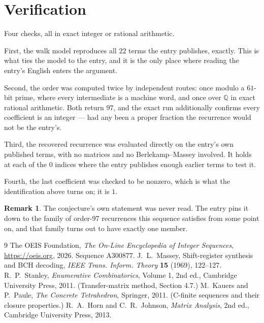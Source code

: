 \documentclass[11pt,a4paper]{article}
\theoremstyle{plain}
\theoremstyle{definition}
\newtheorem{remark}[theorem]{Remark}
\begin{document}
\section{Verification}

Four checks, all in exact integer or rational arithmetic.

First, the walk model reproduces all $22$ terms the entry publishes, exactly. This is
what ties the model to the entry, and it is the only place where reading the entry's English
enters the argument.

Second, the order was computed twice by independent routes: once modulo a $61$-bit prime, where
every intermediate is a machine word, and once over $\mathbb{Q}$ in exact rational arithmetic.
Both return $97$, and the exact run additionally confirms every coefficient is an integer
--- had any been a proper fraction the recurrence would not be the entry's.

Third, the recovered recurrence was evaluated directly on the entry's own published terms, with
no matrices and no Berlekamp--Massey involved. It holds at each of the $0$ indices where
the entry publishes enough earlier terms to test it.

Fourth, the last coefficient was checked to be nonzero, which is what the identification above
turns on; it is $1$.

\begin{remark}
The conjecture's own statement was never read. The entry pins it down to the family of
order-$97$ recurrences this sequence satisfies from some point on, and that family turns
out to have exactly one member.
\end{remark}

\begin{thebibliography}{9}
 The OEIS Foundation, \emph{The On-Line Encyclopedia of Integer
Sequences}, \url{https://oeis.org}, 2026. Sequence A300877.
 J.~L.~Massey, Shift-register synthesis and BCH decoding, \emph{IEEE
Trans. Inform. Theory} \textbf{15} (1969), 122--127.
 R.~P.~Stanley, \emph{Enumerative Combinatorics}, Volume 1, 2nd ed.,
Cambridge University Press, 2011. (Transfer-matrix method, Section 4.7.)
 M.~Kauers and P.~Paule, \emph{The Concrete Tetrahedron}, Springer, 2011.
(C-finite sequences and their closure properties.)
 R.~A.~Horn and C.~R.~Johnson, \emph{Matrix Analysis}, 2nd ed., Cambridge
University Press, 2013.
\end{thebibliography}
\end{document}
